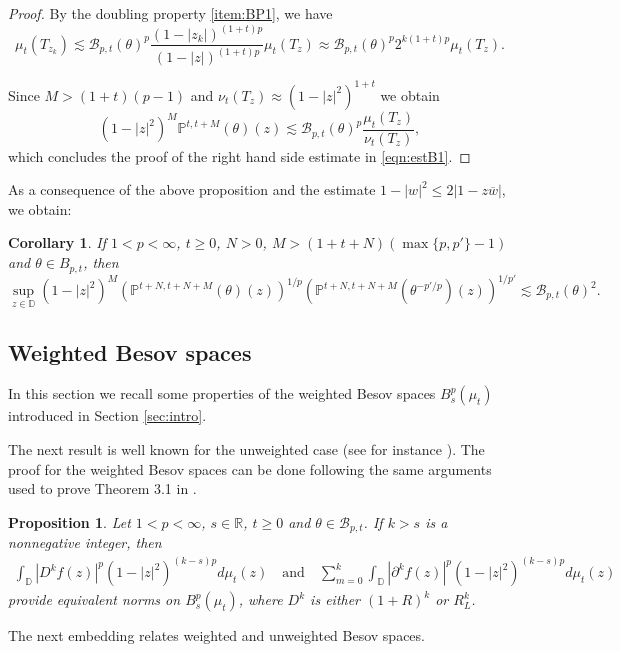 \documentclass[12pt,twoside,leqno,final]{amsart}
\theoremstyle{plain}
\newtheorem{prop}[thm]{Proposition}
\newtheorem{cor}[thm]{Corollary}
\begin{document}
\begin{proof}
By  the doubling property \eqref{item:BP1}, we have 
$$
\mu_t(T_{z_k})\lesssim {{\mathcal B}}_{p,t}(\theta)^p \dfrac{(1-|z_k|)^{(1+t)p}}{(1-|z|)^{(1+t)p}}\mu_t(T_{z})
\approx {{\mathcal B}}_{p,t}(\theta)^p 2^{k(1+t)p} \mu_t(T_{z}).
$$

Since  $M>(1+t)(p-1)$ and  $\nu_t(T_{z})\approx (1-|z|^2)^{1+t}$ we obtain
$$
(1-|z|^2)^M {\mathbb{P}}^{t,t+M}(\theta)(z)\lesssim {{\mathcal B}}_{p,t}(\theta)^p \frac{\mu_t(T_z)}{\nu_t(T_z)},
$$
which concludes the proof of the right hand side estimate in \eqref{eqn:estB1}.
\end{proof} 

As a consequence of the above proposition and the estimate $1-|w|^2\le 2|1-z\overline w|$, 
we obtain:
\begin{cor}\label{cor:BP}
If $1<p<\infty$, $t\ge 0$, $N>0$,  $M>(1+t+N)(\max\{p,p'\}-1)$ and $\theta\in B_{p,t}$, then
$$
\sup_{z\in{{\mathbb D}}}(1-|z|^2)^M \left({\mathbb{P}}^{t+N,t+N+M}(\theta)(z)\right)^{1/p} \left({\mathbb{P}}^{t+N,t+N+M}(\theta^{-p'/p})(z)\right)^{1/p'}\lesssim {{\mathcal B}}_{p,t}(\theta)^2.
$$
\end{cor}

\subsection{Weighted Besov spaces}\quad\par

In this section we recall some properties of the weighted Besov spaces $B^p_s(\mu_t)$ introduced in Section \ref{sec:intro}. 

The next result is well known for the unweighted case (see for instance \cite[Chapters 2, 6]{Zhu2}). The proof for the weighted Besov spaces can be done following the same arguments used to prove Theorem 3.1 in \cite{Ca-Or1}.

\begin{prop} \label{prop:Bpsk} 
Let $1<p<\infty$, $s\in{{\mathbb R}}$, $t\ge 0$ and $\theta\in {{\mathcal B}}_{p,t}$.
If $k>s$ is a nonnegative integer, then  
\begin{align*}
\int_{{\mathbb D}} | D^k f(z)|^p (1-|z|^2)^{(k-s)p}d\mu_t(z)\quad\text{and}\quad
\sum_{m=0}^k\int_{{\mathbb D}} |{\partial}^k f(z)|^p (1-|z|^2)^{(k-s)p}d\mu_t(z)
\end{align*}
provide equivalent norms on $B^p_s(\mu_t)$, where $D^k$ is either $(1+R)^{k}$ or $R^k_L$.  
\end{prop}

The next embedding relates weighted and unweighted Besov spaces.
\end{document}
